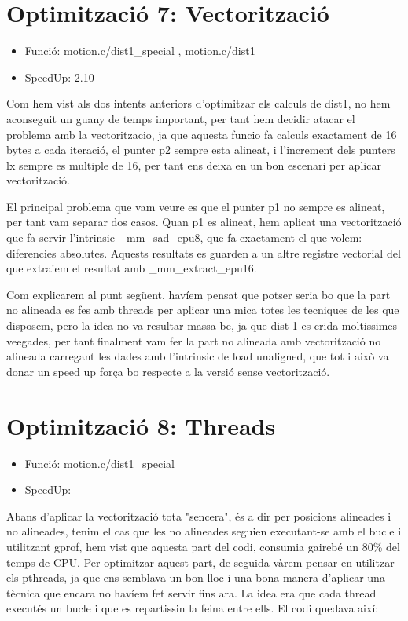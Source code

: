 \section{Optimitzaci\'o 7: Vectoritzaci\'o}
\begin{itemize}
\item{Funció: motion.c/dist1\_special , motion.c/dist1}
\item{SpeedUp: 2.10}
\end{itemize}

Com hem vist als dos intents anteriors d'optimitzar els calculs de dist1, no hem aconseguit un guany de temps important, per tant hem decidir atacar el problema amb la vectoritzacio, ja que aquesta funcio fa calculs exactament de 16 bytes a cada iteració, el punter p2 sempre esta alineat, i l'increment dels punters lx sempre es multiple de 16, per tant ens deixa en un bon escenari per aplicar vectorització.

El principal problema que vam veure es que el punter p1 no sempre es alineat, per tant vam separar dos casos. Quan p1 es alineat, hem aplicat una vectorització que fa servir l'intrinsic \_mm\_sad\_epu8, que fa exactament el que volem: diferencies absolutes. Aquests resultats es guarden a un altre registre vectorial del que extraiem el resultat amb \_mm\_extract\_epu16.

Com explicarem al punt següent, havíem pensat que potser seria bo que la part no alineada es fes amb threads per aplicar una mica totes les tecniques de les que disposem, pero la idea no va resultar massa be, ja que dist 1 es crida moltissimes veegades, per tant finalment vam fer la part no alineada amb vectorització no alineada carregant les dades amb l'intrinsic de load unaligned, que tot i això va donar un speed up força bo respecte a la versió sense vectorització.

\section{Optimitzaci\'o 8: Threads}
\begin{itemize}
\item{Funció: motion.c/dist1\_special}
\item{SpeedUp: -}
\end{itemize}

Abans d'aplicar la vectorització tota "sencera", és a dir per posicions alineades i no alineades, tenim el cas que les no alineades seguien executant-se amb el bucle i utilitzant gprof, hem vist que aquesta part del codi, consumia gairebé un 80\% del temps de CPU. Per optimitzar aquest part, de seguida vàrem pensar en utilitzar els pthreads, ja que ens semblava un bon lloc i una bona manera d'aplicar una tècnica que encara no havíem fet servir fins ara. La idea era que cada thread executés un bucle i que es repartissin la feina entre ells. El codi quedava així:


